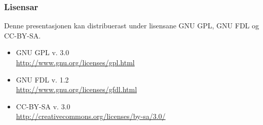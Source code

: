 \documentclass[bigger]{beamer}
\begin{document}
\begin{frame}\frametitle{Lisensar}
  Denne presentasjonen kan distribuerast under lisensane
  GNU GPL, GNU FDL og CC-BY-SA.
  \begin{itemize}
  \item GNU GPL v. 3.0 \\
    \href{http://www.gnu.org/licenses/gpl.html}{http://www.gnu.org/licenses/gpl.html}
  \item GNU FDL v. 1.2 \\
    \href{http://www.gnu.org/licenses/gfdl.html}{http://www.gnu.org/licenses/gfdl.html}
  \item CC-BY-SA v. 3.0 \\
    \href{http://creativecommons.org/licenses/by-sa/3.0/}{http://creativecommons.org/licenses/by-sa/3.0/}
  \end{itemize}
\end{frame}
\end{document}
